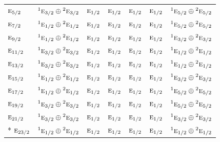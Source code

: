 \documentclass[10pt,a4paper]{article}
\numberwithin{equation}{section}
\newcommand{\irr}[1]{\text{\normalfont\scshape #1}}
\newcommand{\conjpair}[1]{{}^{#1}}
\begin{document}
{\begin{longtable}{@{}lcccccc@{}}
$\irr{e}_{5/2}$ & $\conjpair{1}\irr{e}_{3/2}\oplus \conjpair{2}\irr{e}_{3/2}$ & $\irr{e}_{1/2}$ & $\irr{e}_{1/2}$ & $\irr{e}_{1/2}$ & $\irr{e}_{1/2}$ & $\conjpair{1}\irr{e}_{5/2}\oplus \conjpair{2}\irr{e}_{5/2}$\\
$\irr{e}_{7/2}$ & $\conjpair{1}\irr{e}_{1/2}\oplus \conjpair{2}\irr{e}_{1/2}$ & $\irr{e}_{1/2}$ & $\irr{e}_{1/2}$ & $\irr{e}_{1/2}$ & $\irr{e}_{1/2}$ & $\conjpair{1}\irr{e}_{5/2}\oplus \conjpair{2}\irr{e}_{5/2}$\\
$\irr{e}_{9/2}$ & $\conjpair{1}\irr{e}_{1/2}\oplus \conjpair{2}\irr{e}_{1/2}$ & $\irr{e}_{1/2}$ & $\irr{e}_{1/2}$ & $\irr{e}_{1/2}$ & $\irr{e}_{1/2}$ & $\conjpair{1}\irr{e}_{3/2}\oplus \conjpair{2}\irr{e}_{3/2}$\\
$\irr{e}_{11/2}$ & $\conjpair{1}\irr{e}_{3/2}\oplus \conjpair{2}\irr{e}_{3/2}$ & $\irr{e}_{1/2}$ & $\irr{e}_{1/2}$ & $\irr{e}_{1/2}$ & $\irr{e}_{1/2}$ & $\conjpair{1}\irr{e}_{1/2}\oplus \conjpair{2}\irr{e}_{1/2}$\\
$\irr{e}_{13/2}$ & $\conjpair{1}\irr{e}_{3/2}\oplus \conjpair{2}\irr{e}_{3/2}$ & $\irr{e}_{1/2}$ & $\irr{e}_{1/2}$ & $\irr{e}_{1/2}$ & $\irr{e}_{1/2}$ & $\conjpair{1}\irr{e}_{1/2}\oplus \conjpair{2}\irr{e}_{1/2}$\\
$\irr{e}_{15/2}$ & $\conjpair{1}\irr{e}_{1/2}\oplus \conjpair{2}\irr{e}_{1/2}$ & $\irr{e}_{1/2}$ & $\irr{e}_{1/2}$ & $\irr{e}_{1/2}$ & $\irr{e}_{1/2}$ & $\conjpair{1}\irr{e}_{3/2}\oplus \conjpair{2}\irr{e}_{3/2}$\\
$\irr{e}_{17/2}$ & $\conjpair{1}\irr{e}_{1/2}\oplus \conjpair{2}\irr{e}_{1/2}$ & $\irr{e}_{1/2}$ & $\irr{e}_{1/2}$ & $\irr{e}_{1/2}$ & $\irr{e}_{1/2}$ & $\conjpair{1}\irr{e}_{5/2}\oplus \conjpair{2}\irr{e}_{5/2}$\\
$\irr{e}_{19/2}$ & $\conjpair{1}\irr{e}_{3/2}\oplus \conjpair{2}\irr{e}_{3/2}$ & $\irr{e}_{1/2}$ & $\irr{e}_{1/2}$ & $\irr{e}_{1/2}$ & $\irr{e}_{1/2}$ & $\conjpair{1}\irr{e}_{5/2}\oplus \conjpair{2}\irr{e}_{5/2}$\\
$\irr{e}_{21/2}$ & $\conjpair{1}\irr{e}_{3/2}\oplus \conjpair{2}\irr{e}_{3/2}$ & $\irr{e}_{1/2}$ & $\irr{e}_{1/2}$ & $\irr{e}_{1/2}$ & $\irr{e}_{1/2}$ & $\conjpair{1}\irr{e}_{3/2}\oplus \conjpair{2}\irr{e}_{3/2}$\\*
$\irr{e}_{23/2}$ & $\conjpair{1}\irr{e}_{1/2}\oplus \conjpair{2}\irr{e}_{1/2}$ & $\irr{e}_{1/2}$ & $\irr{e}_{1/2}$ & $\irr{e}_{1/2}$ & $\irr{e}_{1/2}$ & $\conjpair{1}\irr{e}_{1/2}\oplus \conjpair{2}\irr{e}_{1/2}$\\
\bottomrule\end{longtable}}
\end{document}
